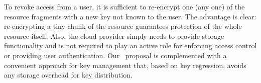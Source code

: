 To revoke access from a user, it is sufficient to re-encrypt one (any one) of the resource fragments with a new key not known to the user. The advantage is clear: re-encrypting a tiny chunk of the resource guarantees protection of the whole resource itself. Also, the cloud provider simply needs to provide storage functionality and is not required to play an active role for enforcing access control or providing user authentication. Our \name\ proposal is complemented with a convenient approach for key management that, based on key regression, avoids any storage overhead for key distribution.

